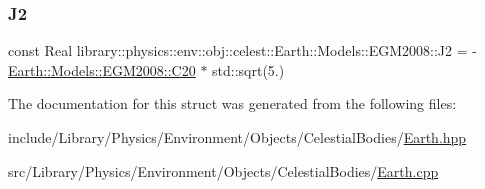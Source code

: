 \subsubsection{\texorpdfstring{J2}{J2}}
{\footnotesize\ttfamily const Real library\+::physics\+::env\+::obj\+::celest\+::\+Earth\+::\+Models\+::\+E\+G\+M2008\+::\+J2 = -\/\hyperlink{structlibrary_1_1physics_1_1env_1_1obj_1_1celest_1_1_earth_1_1_models_1_1_e_g_m2008_a70cf03c48fda3badebf10588c83e183d}{Earth\+::\+Models\+::\+E\+G\+M2008\+::\+C20} $\ast$ std\+::sqrt(5.)\hspace{0.3cm}{\ttfamily [static]}}



The documentation for this struct was generated from the following files\+:\begin{DoxyCompactItemize}
\item 
include/\+Library/\+Physics/\+Environment/\+Objects/\+Celestial\+Bodies/\hyperlink{_earth_8hpp}{Earth.\+hpp}\item 
src/\+Library/\+Physics/\+Environment/\+Objects/\+Celestial\+Bodies/\hyperlink{_earth_8cpp}{Earth.\+cpp}\end{DoxyCompactItemize}
